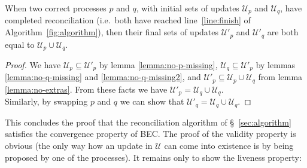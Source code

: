 \documentclass[a4paper,anonymous,USenglish]{lipics-v2019}
\begin{document}
\begin{theorem}\label{theorem:convergence}
When two correct processes $p$ and $q$, with initial sets of updates $\mathcal{U}_p$ and $\mathcal{U}_q$, have completed reconciliation (i.e.\ both have reached line~\ref{line:finish} of Algorithm~\ref{fig:algorithm}), then their final sets of updates $\mathcal{U}'_p$ and $\mathcal{U}'_q$  are both equal to $\mathcal{U}_p \cup \mathcal{U}_q$.
\end{theorem}
\begin{proof}
We have $\mathcal{U}_p \subseteq \mathcal{U}'_p$ by lemma \ref{lemma:no-p-missing}, $\mathcal{U}_q \subseteq \mathcal{U}'_p$ by lemmas \ref{lemma:no-q-missing} and \ref{lemma:no-q-missing2}, and $\mathcal{U}'_p \subseteq \mathcal{U}_p \cup \mathcal{U}_q$ from lemma \ref{lemma:no-extras}.
From these facts we have $\mathcal{U}'_p = \mathcal{U}_q \cup \mathcal{U}_q$.\\
Similarly, by swapping $p$ and $q$ we can show that $\mathcal{U}'_q = \mathcal{U}_q \cup \mathcal{U}_q$.
\end{proof}

This concludes the proof that the reconciliation algorithm of \S~\ref{sec:algorithm} satisfies the convergence property of BEC.
The proof of the validity property is obvious (the only way how an update in $\mathcal{U}$ can come into existence is by being proposed by one of the processes).
It remains only to show the liveness property:
\end{document}
